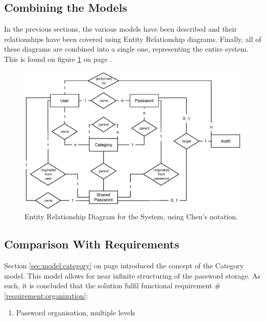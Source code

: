 		\subsection{Combining the Models}
			In the previous sections, the various models have been described and their relationships have been covered using Entity Relationship diagrams. Finally, all of these diagrams are combined into a single one, representing the entire system. This is found on figure \ref{fig:erd:full} on page \pageref{fig:erd:full}.

			\begin{figure}[p]
				\centering
				\includegraphics[width=\textwidth]{figures/design/uml/erd/complete.eps}
				\caption{Entity Relationship Diagram for the System, using Chen's notation.}
				\label{fig:erd:full}
			\end{figure}

		\subsection{Comparison With Requirements}
			\label{requirement:fulfilled:organization}
			\label{requirement:fulfilled:new}
			\label{requirement:fulfilled:retrieve}
			\label{requirement:fulfilled:delete}
			\label{requirement:fulfilled:entries}


			Section \ref{sec:model:category} on page \pageref{sec:model:category} introduced the concept of the Category model. This model allows for near infinite structuring of the password storage. As such, it is concluded that the solution fulfil functional requirement \#\ref{requirement:organization}:
			\vspace{-3ex}\begin{enumerate}
				\setlength\itemsep{0.1em}
				\setcounter{enumi}{4-1}
				\item Password organisation, multiple levels
			\end{enumerate}

